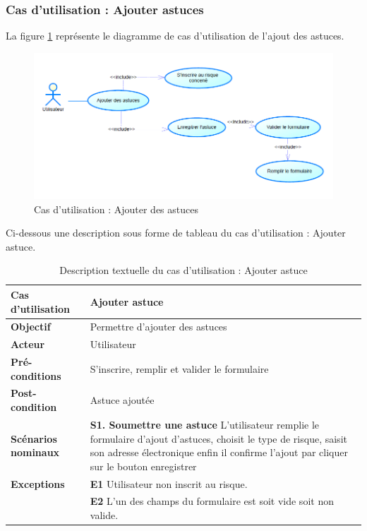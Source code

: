\subsubsection{Cas d'utilisation : Ajouter astuces}

\qquad La figure \ref{fig2.2} représente le diagramme de cas d'utilisation de l'ajout des astuces.

\begin{figure}[!h]
	\begin{center}
		\includegraphics[width=0.64\textheight]{figures/uc_ajoutastuce}
	\end{center}
	\caption{Cas d'utilisation : Ajouter des astuces}
	\label{fig2.2}
\end{figure}

Ci-dessous une description sous forme de tableau du cas d'utilisation : Ajouter astuce.

\begin{table}[!h]
	\caption{Description textuelle du cas d'utilisation : Ajouter astuce}
	\begin{center}
		\begin{tabular}{|L{4cm}|L{10cm}|}
			\hline
			\textbf{Cas d’utilisation} & Ajouter astuce\\
			\hline
			\textbf{Objectif} & Permettre d'ajouter des astuces\\
			\hline
			\textbf{Acteur} & Utilisateur\\
			\hline
			\textbf{Pré-conditions} & S'inscrire, remplir et valider le formulaire\\
			\hline
			\textbf{Post-condition} & Astuce ajoutée\\
			\hline			
			\textbf{Scénarios nominaux} & \textbf{S1. Soumettre une astuce} L'utilisateur remplie le formulaire d'ajout d'astuces, choisit le type de risque, saisit son adresse électronique enfin il confirme l'ajout par cliquer sur le bouton enregistrer\\
			\hline
			\textbf{Exceptions} & \textbf{E1} Utilisateur non inscrit au risque.\\ &\textbf{E2} L'un des champs du formulaire est soit vide soit non valide.\\
			\hline
		\end{tabular}
	\end{center}
\end{table}
 
